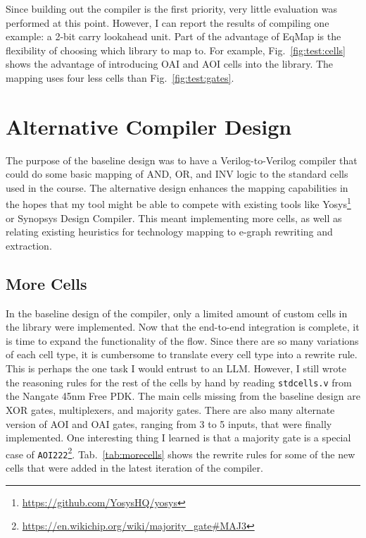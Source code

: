 \documentclass[10pt,letterpaper]{article}
\begin{document}
Since building out the compiler is the first priority, very little evaluation
was performed at this point. However, I can report the results of compiling one
example: a 2-bit carry lookahead unit. Part of the advantage of EqMap is the
flexibility of choosing which library to map to. For example,
Fig.~\ref{fig:test:cells} shows the advantage of introducing OAI and AOI cells
into the library. The mapping uses four less cells than
Fig.~\ref{fig:test:gates}.

\section{Alternative Compiler Design}\label{sec:alt}

The purpose of the baseline design was to have a Verilog-to-Verilog compiler
that could do some basic mapping of AND, OR, and INV logic to the standard
cells used in the course. The alternative design enhances the mapping
capabilities in the hopes that my tool might be able to compete with existing
tools like
Yosys\footnote{\href{https://github.com/YosysHQ/yosys}{https://github.com/YosysHQ/yosys}}
or Synopsys Design Compiler. This meant implementing more cells, as well as
relating existing heuristics for technology mapping to e-graph rewriting and
extraction.

\subsection{More Cells}\label{sec:alt:cells}

In the baseline design of the compiler, only a limited amount of custom cells
in the library were implemented. Now that the end-to-end integration is
complete, it is time to expand the functionality of the flow. Since there are
so many variations of each cell type, it is cumbersome to translate every cell
type into a rewrite rule. This is perhaps the one task I would entrust to an
LLM. However, I still wrote the reasoning rules for the rest of the cells by
hand by reading \texttt{stdcells.v} from the Nangate 45nm Free PDK. The main
cells missing from the baseline design are XOR gates, multiplexers, and
majority gates. There are also many alternate version of AOI and OAI gates,
ranging from 3 to 5 inputs, that were finally implemented. One interesting
thing I learned is that a majority gate is a special case of
\texttt{AOI222}\footnote{\href{https://en.wikichip.org/wiki/majority\_gate\#MAJ3}{https://en.wikichip.org/wiki/majority\_gate\#MAJ3}}.
Tab.~\ref{tab:morecells} shows the rewrite rules for some of the new cells that
were added in the latest iteration of the compiler.
\end{document}

